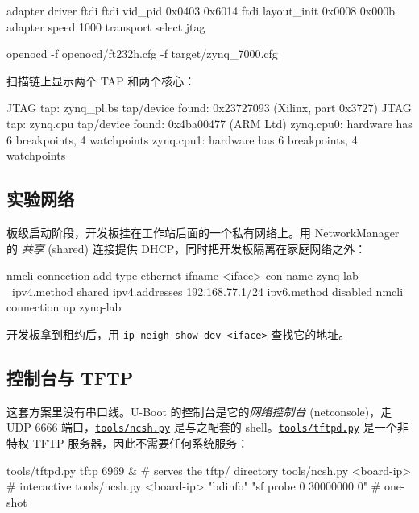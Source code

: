 \documentclass[11pt,a4paper,oneside]{article}
\newcommand{\cmd}[1]{\texttt{#1}}
\newcommand{\repo}{https://github.com/MaxClerkwell/ax7020-bringup}
\newcommand{\rfile}[1]{\href{\repo/blob/master/#1}{\color{bluemid}\nolinkurl{#1}}}
\begin{document}
\begin{code}
adapter driver ftdi
ftdi vid_pid 0x0403 0x6014
ftdi layout_init 0x0008 0x000b
adapter speed 1000
transport select jtag
\end{code}

\begin{shell}
openocd -f openocd/ft232h.cfg -f target/zynq_7000.cfg
\end{shell}

\begin{checkpoint}
扫描链上显示两个 TAP 和两个核心：
\begin{code}
JTAG tap: zynq_pl.bs tap/device found: 0x23727093 (Xilinx, part 0x3727)
JTAG tap: zynq.cpu   tap/device found: 0x4ba00477 (ARM Ltd)
zynq.cpu0: hardware has 6 breakpoints, 4 watchpoints
zynq.cpu1: hardware has 6 breakpoints, 4 watchpoints
\end{code}
\end{checkpoint}

\subsection{实验网络}

板级启动阶段，开发板挂在工作站后面的一个私有网络上。用 NetworkManager 的
\emph{共享} (shared) 连接提供 DHCP，同时把开发板隔离在家庭网络之外：

\begin{shell}
nmcli connection add type ethernet ifname <iface> con-name zynq-lab \
    ipv4.method shared ipv4.addresses 192.168.77.1/24 ipv6.method disabled
nmcli connection up zynq-lab
\end{shell}

开发板拿到租约后，用 \cmd{ip neigh show dev <iface>} 查找它的地址。

\subsection{控制台与 TFTP}

这套方案里没有串口线。U-Boot 的控制台是它的\emph{网络控制台} (netconsole)，走 UDP
6666 端口，\rfile{tools/ncsh.py} 是与之配套的 shell。\rfile{tools/tftpd.py}
是一个非特权 TFTP 服务器，因此不需要任何系统服务：

\begin{shell}
tools/tftpd.py tftp 6969 &                  # serves the tftp/ directory
tools/ncsh.py <board-ip>                    # interactive
tools/ncsh.py <board-ip> "bdinfo" "sf probe 0 30000000 0"   # one-shot
\end{shell}
\end{document}
